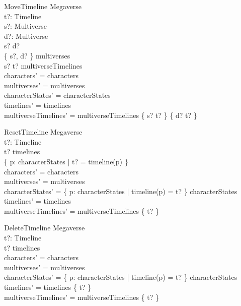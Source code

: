 \documentclass{article}
\begin{document}
\begin{schema}{MoveTimeline}
\Delta Megaverse \\
t?: Timeline \\
s?: Multiverse \\
d?: Multiverse \\
\where
s? \neq d? \\
\{ s?, d? \} \subseteq multiverses \\
s? \mapsto t? \in multiverseTimelines \\
characters' = characters \\ 
multiverses' = multiverses \\
characterStates' = characterStates \\
timelines' = timelines \\ 
multiverseTimelines' = multiverseTimelines \setminus \{ s? \mapsto t? \} \cup \{ d? \mapsto t? \} \\
\end{schema}

\begin{schema}{ResetTimeline}
\Delta Megaverse \\
t?: Timeline \\
\where
t? \in timelines \\
\{ p: \dom characterStates | t? = timeline(p) \} \neq \emptyset \\
characters' = characters \\ 
multiverses' = multiverses \\
characterStates' = \{ p: \dom characterStates | timeline(p) = t? \} \ndres characterStates \\
timelines' = timelines \\
multiverseTimelines' = multiverseTimelines \nrres \{ t? \} \\
\end{schema}

\begin{schema}{DeleteTimeline}
\Delta Megaverse \\
t?: Timeline \\
\where
t? \in timelines \\
characters' = characters \\ 
multiverses' = multiverses \\
characterStates' = \{ p: \dom characterStates | timeline(p) = t? \} \ndres characterStates \\
timelines' = timelines \setminus \{ t? \} \\
multiverseTimelines' = multiverseTimelines \nrres \{ t? \} \\
\end{schema}
\end{document}
